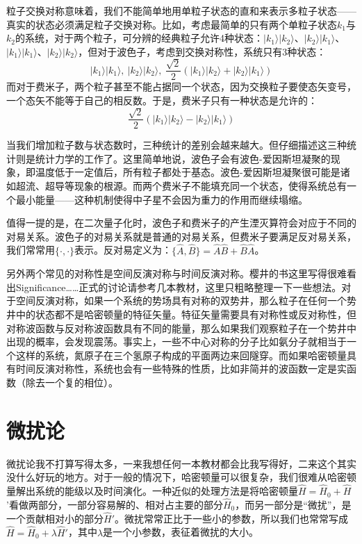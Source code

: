 \documentclass{ctexart}
\begin{document}
粒子交换对称意味着，我们不能简单地用单粒子状态的直和来表示多粒子状态——真实的状态必须满足粒子交换对称。比如，考虑最简单的只有两个单粒子状态$k_1$与$k_2$的系统，对于两个粒子，可分辨的经典粒子允许4种状态：$|k_1\rangle|k_2\rangle$、$|k_2\rangle|k_1\rangle$、$|k_1\rangle|k_1\rangle$、$|k_2\rangle|k_2\rangle$，但对于波色子，考虑到交换对称性，系统只有3种状态：
\begin{equation}
|k_1\rangle|k_1\rangle,\ |k_2\rangle|k_2\rangle,\ \frac{\sqrt{2}}{2}(|k_1\rangle|k_2\rangle+|k_2\rangle|k_1\rangle)
\end{equation}
而对于费米子，两个粒子甚至不能占据同一个状态，因为交换粒子要使态矢变号，一个态矢不能等于自己的相反数。于是，费米子只有一种状态是允许的：
\begin{equation}
\frac{\sqrt{2}}{2}(|k_1\rangle|k_2\rangle-|k_2\rangle|k_1\rangle)
\end{equation}

当我们增加粒子数与状态数时，三种统计的差别会越来越大。但仔细描述这三种统计则是统计力学的工作了。这里简单地说，波色子会有波色-爱因斯坦凝聚的现象，即温度低于一定值后，所有粒子都处于基态。波色-爱因斯坦凝聚很可能是诸如超流、超导等现象的根源。而两个费米子不能填充同一个状态，使得系统总有一个最小能量——这种机制使得中子星不会因为重力的作用而继续塌缩。

值得一提的是，在二次量子化时，波色子和费米子的产生湮灭算符会对应于不同的对易关系。波色子的对易关系就是普通的对易关系，但费米子要满足反对易关系，我们常常用$\{\cdot,\cdot\}$表示。反对易定义为：$\{\hat{A},\hat{B}\}=\hat{A}\hat{B}+\hat{B}\hat{A}$。

另外两个常见的对称性是空间反演对称与时间反演对称。樱井的书这里写得很难看出Significance……正式的讨论请参考几本教材，这里只粗略整理一下一些想法。对于空间反演对称，如果一个系统的势场具有对称的双势井，那么粒子在任何一个势井中的状态都不是哈密顿量的特征矢量。特征矢量需要具有对称性或反对称性，但对称波函数与反对称波函数具有不同的能量，那么如果我们观察粒子在一个势井中出现的概率，会发现震荡。事实上，一些不中心对称的分子比如氨分子就相当于一个这样的系统，氮原子在三个氢原子构成的平面两边来回隧穿。而如果哈密顿量具有时间反演对称性，系统也会有一些特殊的性质，比如非简并的波函数一定是实函数（除去一个复的相位）。

\section{微扰论}
微扰论我不打算写得太多，一来我想任何一本教材都会比我写得好，二来这个其实没什么好玩的地方。对于一般的情况下，哈密顿量可以很复杂，我们很难从哈密顿量解出系统的能级以及时间演化。一种近似的处理方法是将哈密顿量$\hat{H}=\hat{H}_0+\hat{H}$'看做两部分，一部分容易解的、相对占主要的部分$\hat{H}_0$，而另一部分是“微扰”，是一个贡献相对小的部分$\hat{H}'$。微扰常常正比于一些小的参数，所以我们也常常写成$\hat{H}=\hat{H}_0+\lambda\hat{H}'$，其中$\lambda$是一个小参数，表征着微扰的大小。
\end{document}
